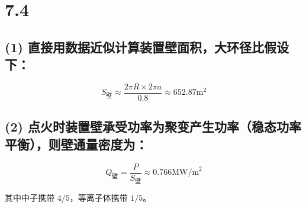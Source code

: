 \documentclass{article}
\begin{document}
\section*{7.4}

\subsection*{(1) 直接用数据近似计算装置壁面积，大环径比假设下：}

$$S_{\text{壁}} \approx \frac{2 \pi R \times 2 \pi a}{0.8} \approx 652.87\text{m}^2$$

\subsection*{(2) 点火时装置壁承受功率为聚变产生功率（稳态功率平衡），则壁通量密度为：}

$$Q_{\text{壁}} = \frac{P}{S_{\text{壁}}} \approx 0.766 \text{MW/m}^2$$

其中中子携带 $4/5$，等离子体携带 $1/5$。
\end{document}
